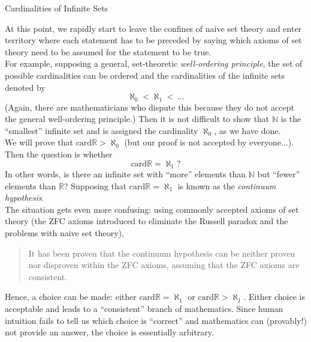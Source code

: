 \documentclass[smaller,hyperref={CJKbookmarks=true}]{beamer}
\newcommand{\N}{\mathbb{N}} \newcommand{\Z}{\mathbb{Z}} \newcommand{\Q}{\mathbb{Q}}
\newcommand{\R}{\mathbb{R}}
\begin{document}
\begin{frame}{Cardinalities of Infinite Sets}
\begin{spacing}{1.05}
At this point, we rapidly start to leave the confines of naive set theory and
enter territory where each statement has to be preceded by saying which
axioms of set theory need to be assumed for the statement to be true.\\[5pt]
For example, supposing a general, set-theoretic \emph{well-ordering principle}, the
set of possible cardinalities can be ordered and the cardinalities of the
infinite sets denoted by
\[\aleph_0<\aleph_1<\,...\]
(Again, there are mathematicians who dispute this because they do not
accept the general well-ordering principle.) Then it is not difficult to show
that $\N$ is the ``smallest'' infinite set and is assigned the cardinality $\aleph_0$, as
we have done.\\[5pt]
We will prove that $\text{card}\R>\aleph_0$ (but our proof is not accepted by
everyone$...$). Then the question is whether
\[\text{card}\R=\aleph_1?\]
\newpage
In other words, is there an infinite set with ``more'' elements than $\N$ but
``fewer'' elements than $\R$? Supposing that $\text{card}\R=\aleph_1$ is known as the
\emph{continuum hypothesis}.\\[6pt]
The situation gets even more confusing: using commonly accepted axioms
of set theory (the ZFC axioms introduced to eliminate the Russell paradox
and the problems with naive set theory),
\begin{quote}
It has been proven that the continuum hypothesis can be neither
proven nor disproven within the ZFC axioms, assuming that the
ZFC axioms are consistent.
\end{quote}
Hence, a choice can be made: either $\text{card}\R=\aleph_1$ or $\text{card}\R>\aleph_1$. Either
choice is acceptable and leads to a ``consistent'' branch of mathematics.
Since human intuition fails to tell us which choice is ``correct'' and
mathematics can (provably!) not provide an answer, the choice is
essentially arbitrary.
\end{spacing}
\end{frame}
\end{document}
